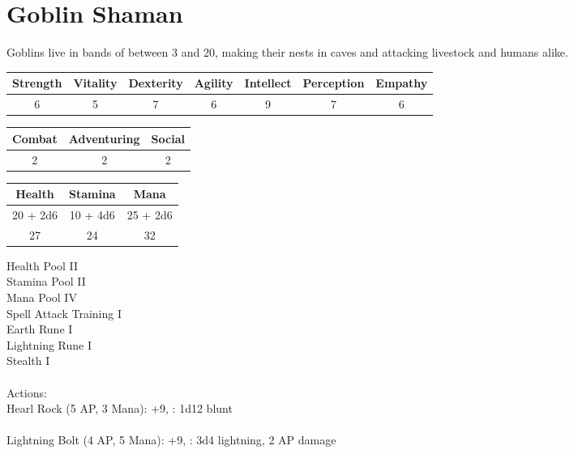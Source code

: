 \section{Goblin Shaman}

Goblins live in bands of between 3 and 20, making their nests in caves and attacking livestock and humans alike.

\begin{minipage}[H]{1\textwidth}
	\centering
	\begin{tabular}[c]{|c | c | c | c | c | c | c|}
		\hline
		Strength & Vitality & Dexterity & Agility & Intellect & Perception & Empathy\\
		\hline
		6 & 5 & 7 & 6 & 9 & 7 & 6\\
		\hline
	\end{tabular}
\end{minipage}
\bigbreak
\begin{minipage}[H]{1\textwidth}
	\centering
	\begin{tabular}[c]{|c | c | c|}
		\hline
		Combat & Adventuring & Social\\
		\hline
		2 & 2 & 2\\
		\hline
	\end{tabular}
\end{minipage}
\bigbreak
\begin{minipage}[H]{1\textwidth}
	\centering
	\begin{tabular}[c]{|c | c | c|}
		\hline
		Health & Stamina & Mana\\
		\hline
		20 + 2d6 & 10 + 4d6 & 25 + 2d6\\
		27 & 24 & 32\\
		\hline
	\end{tabular}
\end{minipage}
\noindent
Health Pool II\\
Stamina Pool II\\
Mana Pool IV\\
Spell Attack Training I\\
Earth Rune I\\
Lightning Rune I\\
Stealth I\\
\\
Actions:\\
Hearl Rock (5 AP, 3 Mana): +9, : 1d12 blunt\\
\\
Lightning Bolt (4 AP, 5 Mana): +9, : 3d4 lightning, 2 AP damage\\
